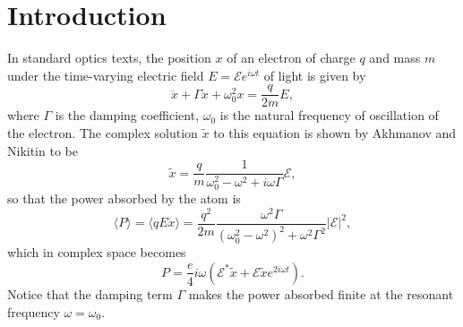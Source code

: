 \documentclass[twocolumn,showpacs,preprintnumbers,amsmath,amssymb]{revtex4}
\begin{document}


\maketitle

\section{Introduction}



In standard optics texts, the position $x$ of an electron of charge $q$ and mass $m$ under the time-varying electric field $E = \mathcal{E}e^{i\omega t}$ of light is given by\cite{Jackson, zangwhale,kleitak}
\begin{equation}
\ddot{x}+\Gamma \dot{x} + \omega_0^2 x = \frac{q}{2m} E, 
\end{equation} 
where $\Gamma$ is the damping coefficient, $\omega_0$  is the natural frequency of oscillation of the electron. The complex solution $\tilde x$ to this equation is shown by Akhmanov and Nikitin \cite{Akhmanovp96} to be 
\begin{equation}
\tilde x = \frac{q}{m}\frac{1}{\omega^2_0 - \omega^2 + i\omega \Gamma}\mathcal{E},
\end{equation} 
so that the power absorbed by the atom is
\begin{equation}
\langle P \rangle = \langle qE\dot{x} \rangle = \frac{q^2}{2m}\frac{\omega^2\Gamma}{(\omega^2_0 - \omega^2)^2 +\omega^2\Gamma^2}|\mathcal{E}|^2, 
\end{equation}
which in complex space becomes 
\begin{equation}
P = \frac{e}{4}i\omega \left(\mathcal{E}^{*}\tilde x + \mathcal{E}\tilde x e^{2i\omega t}\right).
\end{equation} 
Notice that the damping term $\Gamma$ makes the power absorbed finite at the resonant frequency $\omega=\omega_0$. 
\end{document}
